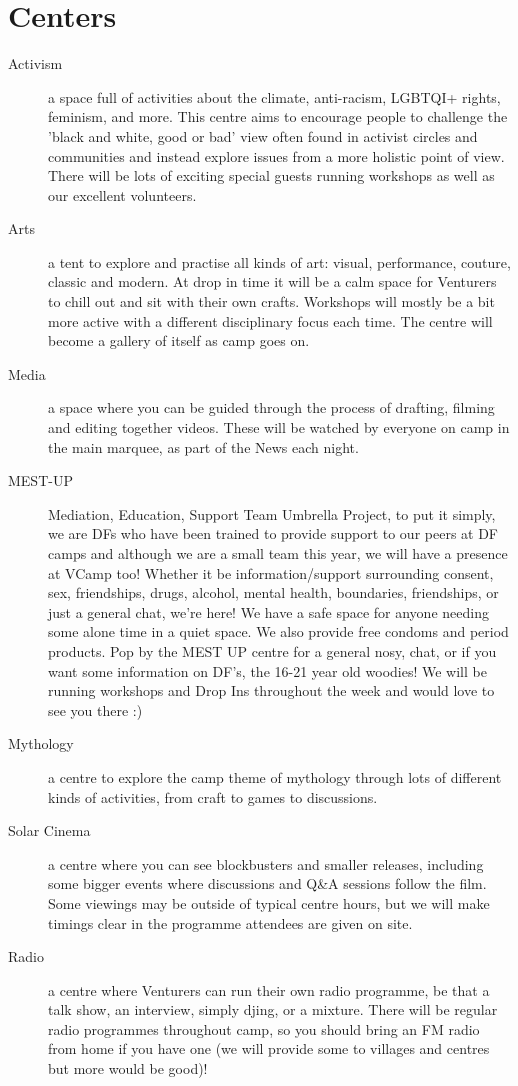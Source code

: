 \documentclass[a4paper, 11pt]{report}
\begin{document}
\section{Centers}
\begin{description}
    \item[Activism] a space full of activities about the climate, anti-racism, LGBTQI+ rights, feminism, and more. This centre aims to encourage people to challenge the 'black and white, good or bad' view often found in activist circles and communities and instead explore issues from a more holistic point of view. There will be lots of exciting special guests running workshops as well as our excellent volunteers.
    \item[Arts] a tent to explore and practise all kinds of art: visual, performance, couture, classic and modern. At drop in time it will be a calm space for Venturers to chill out and sit with their own crafts. Workshops will mostly be a bit more active with a different disciplinary focus each time. The centre will become a gallery of itself as camp goes on.
    \item[Media] a space where you can be guided through the process of drafting, filming and editing together videos. These will be watched by everyone on camp in the main marquee, as part of the News each night.
    \item[MEST-UP] Mediation, Education, Support Team Umbrella Project, to put it simply, we are DFs who have been trained to provide support to our peers at DF camps and although we are a small team this year, we will have a presence at VCamp too! Whether it be information/support surrounding consent, sex, friendships, drugs, alcohol, mental health, boundaries, friendships, or just a general chat, we're here! We have a safe space for anyone needing some alone time in a quiet space. We also provide free condoms and period products. Pop by the MEST UP centre for a general nosy, chat, or if you want some information on DF's, the 16-21 year old woodies! We will be running workshops and Drop Ins throughout the week and would love to see you there :)
    \item[Mythology] a centre to explore the camp theme of mythology through lots of  different kinds of activities, from craft to games to discussions.
    \item[Solar Cinema] a centre where you can see blockbusters and smaller releases, including some bigger events where discussions and Q\&A sessions follow the film. Some viewings may be outside of typical centre hours, but we will make timings clear in the programme attendees are given on site.
    \item[Radio] a centre where Venturers can run their own radio programme, be that a talk show, an interview, simply djing, or a mixture. There will be regular radio programmes throughout camp, so you should bring an FM radio from home if you have one (we will provide some to villages and centres but more would be good)!
\end{description}
\end{document}
